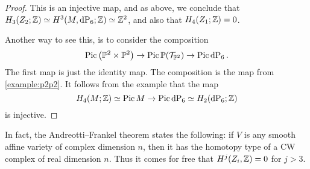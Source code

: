 \begin{proof}
This is an injective map, and as above, we conclude that $H_3(Z_2;\Z) \simeq H^3(M,\dP6;\Z) \simeq \Z^2$, and also that $H_4(Z_1;\mathbb{Z})=0$.

Another way to see this, is to consider the composition
\[
\Pic \left( \P^2 \times \P^2 \right) \to \Pic \P(\mathcal T_{\P^2}) \to \Pic \dP6.
\]
The first map is just the identity map. The composition is the map from \cref{example:p2p2}. It follows from the example that the map
\[
H_4(M; \Z) \simeq \Pic M \to \Pic \dP6 \simeq H_ 2(\dP6; \Z)
\]
is injective.
\end{proof}

\begin{remark}
In fact, the Andreotti--Frankel theorem \cite{andreotti_affinecw} states the following: if $V$ is any smooth affine variety of complex dimension $n$, then it has the homotopy type of a CW complex of real dimension $n$. Thus it comes for free that $H^j(Z_i,\mathbb{Z})=0$ for $j > 3$.
\end{remark}
 